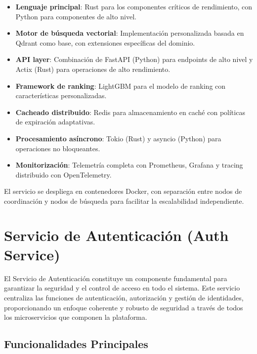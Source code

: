 \documentclass[12pt,a4paper]{article}
\begin{document}
\begin{itemize}
    \item \textbf{Lenguaje principal}: Rust para los componentes críticos de rendimiento, con Python para componentes de alto nivel.
    
    \item \textbf{Motor de búsqueda vectorial}: Implementación personalizada basada en Qdrant como base, con extensiones específicas del dominio.
    
    \item \textbf{API layer}: Combinación de FastAPI (Python) para endpoints de alto nivel y Actix (Rust) para operaciones de alto rendimiento.
    
    \item \textbf{Framework de ranking}: LightGBM para el modelo de ranking con características personalizadas.
    
    \item \textbf{Cacheado distribuido}: Redis para almacenamiento en caché con políticas de expiración adaptativas.
    
    \item \textbf{Procesamiento asíncrono}: Tokio (Rust) y asyncio (Python) para operaciones no bloqueantes.
    
    \item \textbf{Monitorización}: Telemetría completa con Prometheus, Grafana y tracing distribuido con OpenTelemetry.
\end{itemize}

El servicio se despliega en contenedores Docker, con separación entre nodos de coordinación y nodos de búsqueda para facilitar la escalabilidad independiente.

\section{Servicio de Autenticación (Auth Service)}
\label{sec:auth-service}

El Servicio de Autenticación constituye un componente fundamental para garantizar la seguridad y el control de acceso en todo el sistema. Este servicio centraliza las funciones de autenticación, autorización y gestión de identidades, proporcionando un enfoque coherente y robusto de seguridad a través de todos los microservicios que componen la plataforma.

\subsection{Funcionalidades Principales}
\label{subsec:as-funcionalidades}
\end{document}
